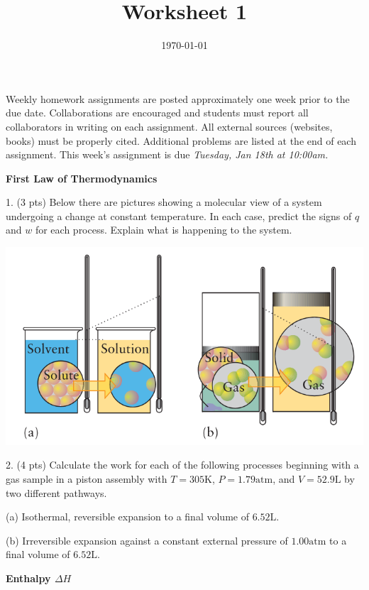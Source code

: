 \documentclass[11pt]{article}
\title{\textbf{Worksheet 1}}
\date{\vspace{-2em}\today}
\begin{document}
\maketitle

Weekly homework assignments are posted approximately one week prior to the
due date. Collaborations are encouraged and students must report all collaborators
in writing on each assignment. All external sources (websites, books) must be
properly cited. Additional problems are listed at the end of each assignment.
This week's assignment is due \textit{Tuesday, Jan 18th at 10:00am.}

\textbf{First Law of Thermodynamics}

1. (3 pts) Below there are pictures showing a molecular view of a system
undergoing a change at constant temperature. In each case, predict the signs
of $q$ and $w$ for each process. Explain what is happening to the system.

\begin{center}
  \includegraphics[scale=0.35]{phase_change.png}
\end{center}

\vspace{1in}

2. (4 pts) Calculate the work for each of the following processes beginning with a gas
sample in a piston assembly with $T=305\text{K}$, $P=1.79\text{atm}$, and
$V=52.9\text{L}$ by two different pathways.

(a) Isothermal, reversible expansion to a final volume of $6.52\text{L}$.

(b) Irreversible expansion against a constant external pressure of $1.00\text{atm}$
to a final volume of $6.52\text{L}$.

\vspace{1.2in}

\textbf{Enthalpy $\Delta H$}
\end{document}
